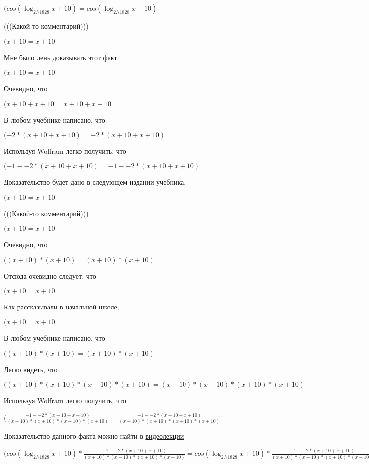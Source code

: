 \documentclass[12pt,a4paper,fleqn]{article}
\theoremstyle{definition}
\begin{document}
$(cos(\log_{ 2.71828 }{ x  +  10 }) = cos(\log_{ 2.71828 }{ x  +  10 })$

(((Какой-то комментарий)))

$( x  +  10  =  x  +  10 $

Мне было лень доказывать этот факт.

$( x  +  10  =  x  +  10 $

Очевидно, что

$( x  +  10  +  x  +  10  =  x  +  10  +  x  +  10 $

В любом учебнике написано, что

$( -2  * ( x  +  10  +  x  +  10 ) =  -2  * ( x  +  10  +  x  +  10 )$

Используя Wolfram легко получить, что

$( -1  -  -2  * ( x  +  10  +  x  +  10 ) =  -1  -  -2  * ( x  +  10  +  x  +  10 )$

Доказательство будет дано в следующем издании учебника.

$( x  +  10  =  x  +  10 $

(((Какой-то комментарий)))

$( x  +  10  =  x  +  10 $

Очевидно, что

$(( x  +  10 ) * ( x  +  10 ) = ( x  +  10 ) * ( x  +  10 )$

Отсюда очевидно следует, что

$( x  +  10  =  x  +  10 $

Как рассказывали в начальной школе,

$( x  +  10  =  x  +  10 $

В любом учебнике написано, что

$(( x  +  10 ) * ( x  +  10 ) = ( x  +  10 ) * ( x  +  10 )$

Легко видеть, что

$(( x  +  10 ) * ( x  +  10 ) * ( x  +  10 ) * ( x  +  10 ) = ( x  +  10 ) * ( x  +  10 ) * ( x  +  10 ) * ( x  +  10 )$

Используя Wolfram легко получить, что

$(\frac{ -1  -  -2  * ( x  +  10  +  x  +  10 )}{( x  +  10 ) * ( x  +  10 ) * ( x  +  10 ) * ( x  +  10 )}
 = \frac{ -1  -  -2  * ( x  +  10  +  x  +  10 )}{( x  +  10 ) * ( x  +  10 ) * ( x  +  10 ) * ( x  +  10 )}
$

Доказательство данного факта можно найти в \href{https://www.youtube.com/watch?v=dQw4w9WgXcQ}{видеолекции}

$(cos(\log_{ 2.71828 }{ x  +  10 }) * \frac{ -1  -  -2  * ( x  +  10  +  x  +  10 )}{( x  +  10 ) * ( x  +  10 ) * ( x  +  10 ) * ( x  +  10 )}
 = cos(\log_{ 2.71828 }{ x  +  10 }) * \frac{ -1  -  -2  * ( x  +  10  +  x  +  10 )}{( x  +  10 ) * ( x  +  10 ) * ( x  +  10 ) * ( x  +  10 )}
$
\end{document}
